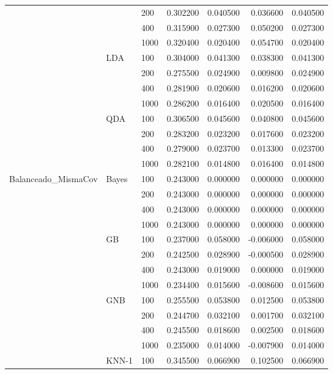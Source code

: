 \begin{tabular}{lllrrrr}
 &  & 200 & 0.302200 & 0.040500 & 0.036600 & 0.040500 \\
 &  & 400 & 0.315900 & 0.027300 & 0.050200 & 0.027300 \\
 &  & 1000 & 0.320400 & 0.020400 & 0.054700 & 0.020400 \\
\cline{2-7}
 & \multirow[t]{4}{*}{LDA} & 100 & 0.304000 & 0.041300 & 0.038300 & 0.041300 \\
 &  & 200 & 0.275500 & 0.024900 & 0.009800 & 0.024900 \\
 &  & 400 & 0.281900 & 0.020600 & 0.016200 & 0.020600 \\
 &  & 1000 & 0.286200 & 0.016400 & 0.020500 & 0.016400 \\
\cline{2-7}
 & \multirow[t]{4}{*}{QDA} & 100 & 0.306500 & 0.045600 & 0.040800 & 0.045600 \\
 &  & 200 & 0.283200 & 0.023200 & 0.017600 & 0.023200 \\
 &  & 400 & 0.279000 & 0.023700 & 0.013300 & 0.023700 \\
 &  & 1000 & 0.282100 & 0.014800 & 0.016400 & 0.014800 \\
\cline{1-7} \cline{2-7}
\multirow[t]{32}{*}{Balanceado_MismaCov} & \multirow[t]{4}{*}{Bayes} & 100 & 0.243000 & 0.000000 & 0.000000 & 0.000000 \\
 &  & 200 & 0.243000 & 0.000000 & 0.000000 & 0.000000 \\
 &  & 400 & 0.243000 & 0.000000 & 0.000000 & 0.000000 \\
 &  & 1000 & 0.243000 & 0.000000 & 0.000000 & 0.000000 \\
\cline{2-7}
 & \multirow[t]{4}{*}{GB} & 100 & 0.237000 & 0.058000 & -0.006000 & 0.058000 \\
 &  & 200 & 0.242500 & 0.028900 & -0.000500 & 0.028900 \\
 &  & 400 & 0.243000 & 0.019000 & 0.000000 & 0.019000 \\
 &  & 1000 & 0.234400 & 0.015600 & -0.008600 & 0.015600 \\
\cline{2-7}
 & \multirow[t]{4}{*}{GNB} & 100 & 0.255500 & 0.053800 & 0.012500 & 0.053800 \\
 &  & 200 & 0.244700 & 0.032100 & 0.001700 & 0.032100 \\
 &  & 400 & 0.245500 & 0.018600 & 0.002500 & 0.018600 \\
 &  & 1000 & 0.235000 & 0.014000 & -0.007900 & 0.014000 \\
\cline{2-7}
 & \multirow[t]{4}{*}{KNN-1} & 100 & 0.345500 & 0.066900 & 0.102500 & 0.066900 \\

\end{tabular}
